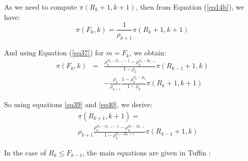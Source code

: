 \documentclass[conference]{IEEEtran}
\begin{document}
As we need to compute $\pi(R_{k}+1, k+1)$, then from Equation (\ref{eq14b}), we have:
\begin{equation}
\pi(F_{k},k)= \frac{1}{\rho_{k+1}} \pi(R_{k}+1,k+1)
\label{eq39}
\end{equation}


And using Equation (\ref{eq37}) for $m=F_k$, we obtain:
\begin{eqnarray}
\pi(F_k,k)&=& \frac{ \rho_k ^{F_k-F_{k-1}-1} -\rho_k^{F_k-R_{k-1}} } {1-\rho_k} \pi(R_{k-1}+1,k) \\
&&- \frac{\rho_k}{\rho_{k+1}} \frac{1- \rho_k ^{F_k-R_k}} {1-\rho_k} \pi(R_{k}+1, k+1)
 \label{eq40}
\end{eqnarray}


So using equations \ref{eq39} and \ref{eq40}, we derive:
\begin{eqnarray}
&&\pi(R_{k+1},k+1)= \nonumber\\
&&\rho_{k+1} \frac{ \rho_k^{F_k-F_{k-1}-1}
-\rho_k^{F_k-R_{k-1}} } { 1- \rho_k^{F_k-R_{k}+1}} \pi(R_{k-1}+1,k)
\label{eq50}
\end{eqnarray}



In the case of $R_{k} \leq F_{k-1}$, the main equations are given in Tuffin : 
\end{document}
